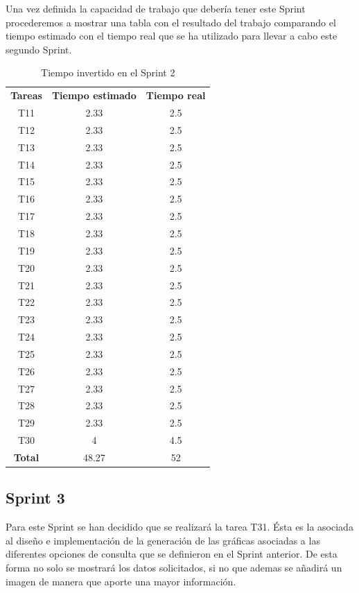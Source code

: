 Una vez definida la capacidad de trabajo que debería tener este Sprint procederemos a mostrar una tabla con el resultado del trabajo comparando el tiempo estimado con el tiempo real que se ha utilizado para llevar a cabo este segundo Sprint.

\begin{table}[H]
	\begin{center}
		\begin{tabular}{| c | c | c |}
			\hline
			
			\textbf{Tareas} & \textbf{Tiempo estimado} & \textbf{Tiempo real} \\
			T11 & 2.33 & 2.5 \\
			T12 & 2.33 & 2.5 \\
			T13 & 2.33 & 2.5 \\
			T14 & 2.33 & 2.5 \\
			T15 & 2.33 & 2.5 \\
			T16 & 2.33 & 2.5 \\
			T17 & 2.33 & 2.5 \\
			T18 & 2.33 & 2.5 \\
			T19 & 2.33 & 2.5 \\
			T20 & 2.33 & 2.5 \\
			T21 & 2.33 & 2.5 \\
			T22 & 2.33 & 2.5 \\
			T23 & 2.33 & 2.5 \\
			T24 & 2.33 & 2.5 \\
			T25 & 2.33 & 2.5 \\
			T26 & 2.33 & 2.5 \\
			T27 & 2.33 & 2.5 \\
			T28 & 2.33 & 2.5 \\
			T29 & 2.33 & 2.5 \\
			T30 & 4 & 4.5 \\
			\textbf{Total} & 48.27 & 52 \\ \hline
		\end{tabular}
		\caption{Tiempo invertido en el Sprint 2}
	\end{center}
\end{table}

\subsection{Sprint 3}

Para este Sprint se han decidido que se realizará la tarea T31. Ésta es la asociada al diseño e implementación de la generación de las gráficas asociadas a las diferentes opciones de consulta que se definieron en el Sprint anterior. De esta forma no solo se mostrará los datos solicitados, si no que ademas se añadirá un imagen de manera que aporte una mayor información.

